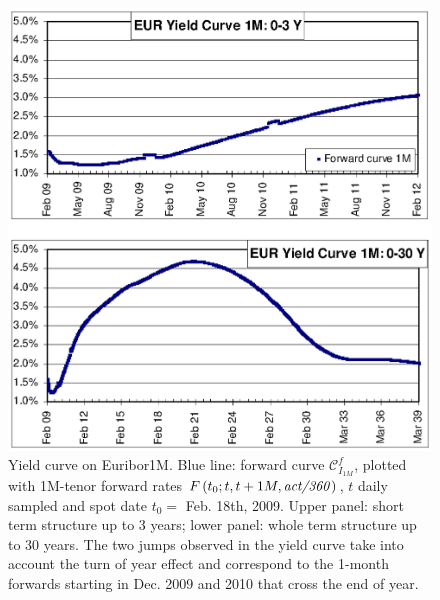 \documentclass[11pt,reqno]{amsart}
\begin{document}
\begin{figure}[p]
\centering
\includegraphics[scale=1.0]{./FigYC1M}
\caption{Yield curve on Euribor1M. Blue line: forward curve $\mathcal{C}_{I_{1M}}^f$, plotted with 1M-tenor forward rates $F\left( t_{0};t,t+1M,\text{\textit{act/360}}\right)$, $t$ daily sampled and spot date $t_{0}=$ Feb. 18th, 2009. Upper panel: short term structure up to 3 years; lower panel: whole term structure up to 30 years. The two jumps observed in the yield curve take into account the turn of year effect and correspond to the 1-month forwards starting in Dec. 2009 and 2010 that cross the end of year.}
\label{FigYC1M}
\end{figure}
\end{document}
